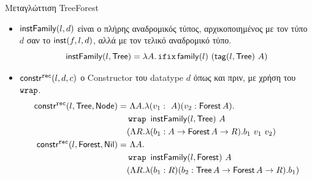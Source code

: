 \documentclass[10pt]{beamer}
\begin{document}
\begin{frame}{Μεταγλώττιση TreeForest}

\begin{itemize}[<+->]

  \item $\mathsf{instFamily}(l, d)$ είναι ο πλήρης αναδρομικός τύπος, αρχικοποιημένος με τον τύπο $d$ σαν το $\mathsf{inst}(f, l, d)$, αλλά με
  τον τελικό αναδρομικό τύπο.
    $$\mathsf{instFamily}(l, \operatorname{\textsf{Tree}}) = \lambda A . \operatorname{\texttt{ifix}} \mathsf{family}(l)\ (\mathsf{tag}(l, \operatorname{\textsf{Tree}})\ A)$$
  \item $\mathsf{constr}^{\operatorname{\texttt{rec}}}(l, d, c)$ ο  Constructor του
    datatype $d$ όπως και πριν, με χρήση του $\operatorname{\texttt{wrap}}$.
    \begin{align*}
    \mathsf{constr}^{\operatorname{\texttt{rec}}}(l, \operatorname{\textsf{Tree}}, \operatorname{\textsf{Node}}) =&\ \Lambda A . \lambda (v_1 : \ A) (v_2 : \operatorname{\textsf{Forest}} A) .\\
                               &\operatorname{\texttt{wrap}}\ \mathsf{instFamily}(l, \operatorname{\textsf{Tree}})\ A\\
                               &(\Lambda R . \lambda (b_1 : A \rightarrow \operatorname{\textsf{Forest}} A \rightarrow R) . b_1\ v_1\ v_2)\\
    \mathsf{constr}^{\operatorname{\texttt{rec}}}(l, \operatorname{\textsf{Forest}}, \operatorname{\textsf{Nil}}) =&\ \Lambda A . \\
                               &\operatorname{\texttt{wrap}}\ \mathsf{instFamily}(l, \operatorname{\textsf{Forest}})\ A\\
                               &(\Lambda R . \lambda (b_1 : R) (b_2 : \operatorname{\textsf{Tree}} A \rightarrow \operatorname{\textsf{Forest}} A \rightarrow R) . b_1)\\
    \end{align*}
\end{itemize}
\end{frame}
\end{document}
